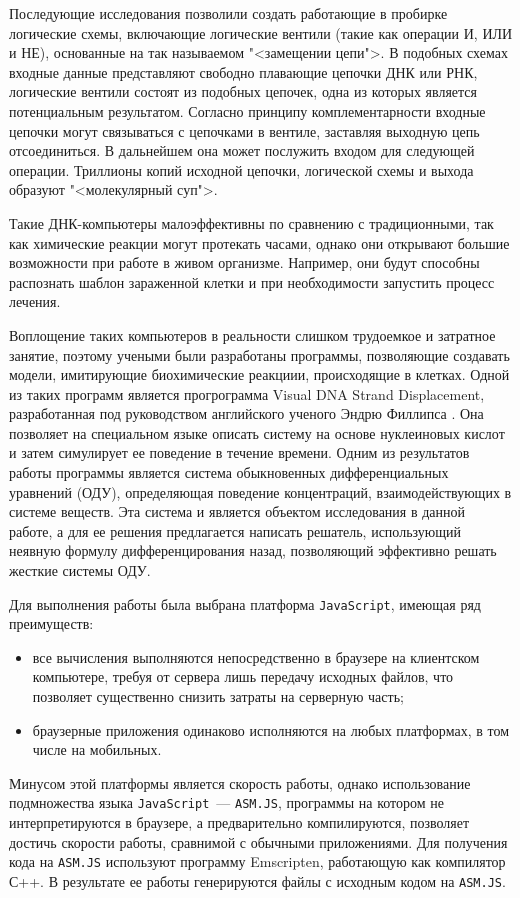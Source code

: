 \documentclass[oneside,final,14pt]{extreport}
\begin{document}
	Последующие исследования позволили создать работающие в пробирке логические схемы, включающие логические вентили (такие как операции И, ИЛИ и НЕ), основанные на так называемом "<замещении цепи">. В подобных схемах входные данные представляют свободно плавающие цепочки ДНК или РНК, логические вентили состоят из подобных цепочек, одна из которых является потенциальным результатом. Согласно принципу комплементарности входные цепочки могут связываться с цепочками в вентиле, заставляя выходную цепь отсоединиться. В дальнейшем она может послужить входом для следующей операции. Триллионы копий исходной цепочки, логической схемы и выхода образуют "<молекулярный суп">.
	
	Такие ДНК\--компьютеры малоэффективны по сравнению с традиционными, так как химические реакции могут протекать часами, однако они открывают большие возможности при работе в живом организме. Например, они будут способны распознать шаблон зараженной клетки и при необходимости запустить процесс лечения.
	
	Воплощение таких компьютеров в реальности слишком трудоемкое и затратное занятие, поэтому учеными были разработаны программы, позволяющие создавать модели, имитирующие биохимические реакциии, происходящие в клетках. Одной из таких программ является прогрограмма Visual DNA Strand Displacement, разработанная под руководством английского ученого Эндрю Филлипса \cite{soup}. Она позволяет на специальном языке описать систему на основе нуклеиновых кислот и затем симулирует ее поведение в течение времени. Одним из результатов работы программы является система обыкновенных дифференциальных уравнений (ОДУ), определяющая поведение концентраций, взаимодействующих в системе веществ. Эта система и является объектом исследования в данной работе, а для ее решения предлагается написать решатель, использующий неявную формулу дифференцирования назад, позволяющий эффективно решать жесткие системы ОДУ.
	
	Для выполнения работы была выбрана платформа \texttt{JavaScript}, имеющая ряд преимуществ:
\begin{itemize}
\item все вычисления выполняются непосредственно в браузере на клиентском компьютере, требуя от сервера лишь передачу исходных файлов, что позволяет существенно снизить затраты на серверную часть;
\item браузерные приложения одинаково исполняются на любых платформах, в том числе на мобильных.
\end{itemize}
Минусом этой платформы является скорость работы, однако использование подмножества языка \texttt{JavaScript}~--- \texttt{ASM.JS}, программы на котором не интерпретируются в браузере, а предварительно компилируются, позволяет достичь скорости работы, сравнимой с обычными приложениями. Для получения кода на \texttt{ASM.JS} используют программу Emscripten, работающую как компилятор С++. В результате ее работы генерируются файлы с исходным кодом на \texttt{ASM.JS}.
\end{document}
